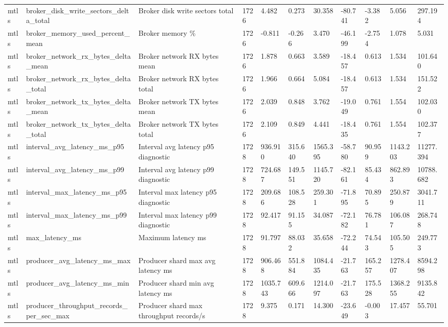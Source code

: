 \begin{longtable}{lllllllllll}
mtls & broker\_disk\_write\_sectors\_delta\_total & Broker disk write sectors total & 1726 & 4.482 & 0.273 & 30.358 & -80.741 & -3.382 & 5.056 & 297.194 \\
mtls & broker\_memory\_used\_percent\_mean & Broker memory \% & 1726 & -0.811 & -0.266 & 3.470 & -46.199 & -2.754 & 1.078 & 5.031 \\
mtls & broker\_network\_rx\_bytes\_delta\_mean & Broker network RX bytes mean & 1726 & 1.878 & 0.663 & 3.589 & -18.457 & 0.613 & 1.534 & 101.640 \\
mtls & broker\_network\_rx\_bytes\_delta\_total & Broker network RX bytes total & 1726 & 1.966 & 0.664 & 5.084 & -18.457 & 0.613 & 1.534 & 151.522 \\
mtls & broker\_network\_tx\_bytes\_delta\_mean & Broker network TX bytes mean & 1726 & 2.039 & 0.848 & 3.762 & -19.049 & 0.761 & 1.554 & 102.030 \\
mtls & broker\_network\_tx\_bytes\_delta\_total & Broker network TX bytes total & 1726 & 2.109 & 0.849 & 4.441 & -18.435 & 0.761 & 1.554 & 102.377 \\
mtls & interval\_avg\_latency\_ms\_p95 & Interval avg latency p95 diagnostic & 1728 & 936.910 & 315.640 & 1565.395 & -58.780 & 90.959 & 1143.203 & 11277.394 \\
mtls & interval\_avg\_latency\_ms\_p99 & Interval avg latency p99 diagnostic & 1728 & 724.687 & 149.551 & 1145.720 & -82.161 & 85.434 & 862.893 & 10788.682 \\
mtls & interval\_max\_latency\_ms\_p95 & Interval max latency p95 diagnostic & 1728 & 209.686 & 108.528 & 259.301 & -71.895 & 70.895 & 250.879 & 3041.711 \\
mtls & interval\_max\_latency\_ms\_p99 & Interval max latency p99 diagnostic & 1728 & 92.417 & 91.155 & 34.087 & -72.182 & 76.781 & 106.087 & 268.748 \\
mtls & max\_latency\_ms & Maximum latency ms & 1728 & 91.797 & 88.032 & 35.658 & -72.244 & 74.543 & 105.505 & 249.773 \\
mtls & producer\_avg\_latency\_ms\_max & Producer shard max avg latency ms & 1728 & 906.468 & 551.884 & 1084.435 & -21.763 & 165.257 & 1278.407 & 8594.298 \\
mtls & producer\_avg\_latency\_ms\_min & Producer shard min avg latency ms & 1728 & 1035.743 & 609.666 & 1214.097 & -21.763 & 175.528 & 1368.255 & 9135.842 \\
mtls & producer\_throughput\_records\_per\_sec\_max & Producer shard max throughput records/s & 1728 & 9.375 & 0.171 & 14.300 & -23.649 & -0.003 & 17.457 & 55.701 \\

\end{longtable}
